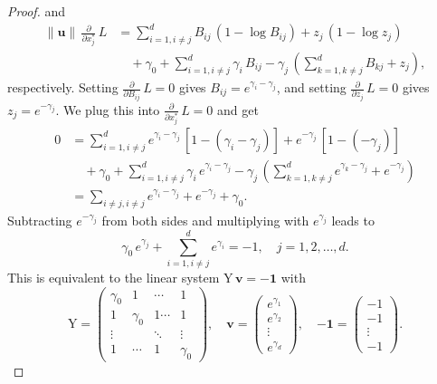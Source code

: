 \documentclass[smallextended]{svjour3}
\renewcommand{\tens}[1]{\mathrm{#1}}
\renewcommand{\vec}[1]{\mathbf{#1}}
\newcommand{\suml}{\sum\limits}
\newcommand{\pderiv}[1]{\frac{\partial}{\partial #1}}
\newcommand{\vnorms}[1]{\|#1\|}
\begin{document}
\begin{proof}
		and
		\begin{equation}
      \begin{aligned}
        \vnorms{\vec{u}}\,\pderiv{x_j^\ast}\,L &= \suml_{i=1,i\neq j}^d B_{ij}\,(1-\log B_{ij}) + z_j\,(1-\log z_j)\\
        &\quad+ \gamma_0 + \suml_{i=1,i\neq j}^d \gamma_i\,B_{ij} - \gamma_j\,\left(\suml_{k=1,k\neq j}^d B_{kj} + z_j\right), 
      \end{aligned}
    \end{equation}
		respectively.
		Setting $\pderiv{B_{ij}}\,L=0$ gives $B_{ij} = e^{\gamma_i-\gamma_j}$, and setting $\pderiv{z_j}\,L = 0$ gives $z_j = e^{-\gamma_j}$.
		We plug this into $\pderiv{x_j^\ast}\,L=0$ and get
		\begin{equation}
      \begin{aligned}
        0 &= \suml_{i=1,i\neq j}^d e^{\gamma_i-\gamma_j}\,[1-(\gamma_i-\gamma_j)] + e^{-\gamma_j}\,[1-(-\gamma_j)]\\
        &\quad + \gamma_0 + \suml_{i=1,i\neq j}^d \gamma_i\,e^{\gamma_i-\gamma_j} - \gamma_j\,\left(\suml_{k=1,k\neq j}^d e^{\gamma_k-\gamma_j}+e^{-\gamma_j}\right)\\
        &= \suml_{i\neq j,i\neq j} e^{\gamma_i-\gamma_j}+e^{-\gamma_j} + \gamma_0.
      \end{aligned}
    \end{equation}
		Subtracting $e^{-\gamma_j}$ from both sides and multiplying with $e^{\gamma_j}$ leads to
		\begin{equation}
			\gamma_0\,e^{\gamma_j}+\suml_{i=1,i\neq j}^d e^{\gamma_i} = -1,\quad j=1,2,\ldots,d.
		\end{equation}
		This is equivalent to the linear system $\tens{Y}\,\vec{v} = \vec{-1}$ with
		\begin{equation}
			\tens{Y} = \begin{pmatrix}
									\gamma_0 & 1 & \cdots & 1\\
									1 & \gamma_0 & 1 \cdots & 1 \\
									\vdots & & \ddots & \vdots\\
									1 & \cdots & 1 & \gamma_0
								\end{pmatrix},\quad
			\vec{v} = \begin{pmatrix} e^{\gamma_1}\\ e^{\gamma_2}\\ \vdots \\ e^{\gamma_d} \end{pmatrix},\quad
			\vec{-1} = \begin{pmatrix} -1 \\ -1 \\ \vdots \\ -1 \end{pmatrix}.

\end{equation}
\end{proof}
\end{document}
